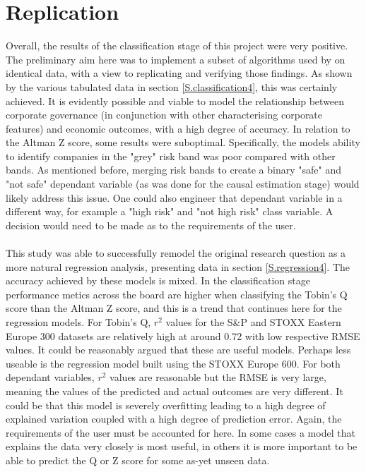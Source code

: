\section{Replication}
{Overall, the results of the classification stage of this project were very positive. The preliminary aim here was to implement a subset of algorithms used by \cite{moldovan2015learning} on identical data, with a view to replicating and verifying those findings. As shown by the various tabulated data in section \ref{S.classification4}, this was certainly achieved. It is evidently possible and viable to model the relationship between corporate governance (in conjunction with other characterising corporate features) and economic outcomes, with a high degree of accuracy. In relation to the Altman Z score, some results were suboptimal. Specifically, the models ability to identify companies in the "grey" risk band was poor compared with other bands. As mentioned before, merging risk bands to create a binary "safe" and "not safe" dependant variable (as was done for the causal estimation stage) would likely address this issue. One could also engineer that dependant variable in a different way, for example a "high risk" and "not high risk" class variable. A decision would need to be made as to the requirements of the user. \\\\
This study was able to successfully remodel the original research question as a more natural regression analysis, presenting data in section \ref{S.regression4}. The accuracy achieved by these models is mixed. In the classification stage performance metics across the board are higher when classifying the Tobin's Q score than the Altman Z score, and this is a trend that continues here for the regression models. For Tobin's Q, $r^2$ values for the S\&P and STOXX Eastern Europe 300 datasets are relatively high at around 0.72 with low respective RMSE values. It could be reasonably argued that these are useful models. Perhaps less useable is the regression model built using the STOXX Europe 600. For both dependant variables, $r^2$ values are reasonable but the RMSE is very large, meaning the values of the predicted and actual outcomes are very different. It could be that this model is severely overfitting leading to a high degree of explained variation coupled with a high degree of prediction error. Again, the requirements of the user must be accounted for here. In some cases a model that explains the data very closely is most useful, in others it is more important to be able to predict the Q or Z score for some as-yet unseen data. \\\\
}
